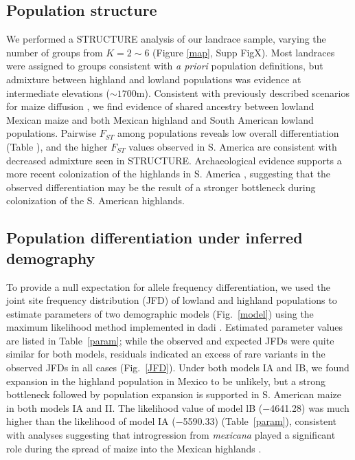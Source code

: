 \subsection*{Population structure}

We performed a {\sf STRUCTURE} analysis \cite[]{Pritchard_2000_10835412,Falush_2003_12930761} of our landrace sample, varying the number of groups from $K=2\sim 6$ (Figure \ref{map}, Supp FigX). 
Most landraces were assigned to groups consistent with \emph{a priori} population definitions, but admixture between highland and lowland populations was evidence at intermediate elevations ($\sim1700$m).  Consistent with previously described scenarios for maize diffusion \cite[]{Piperno_2006_69}, we find evidence of shared ancestry between lowland Mexican maize and both Mexican highland and South American lowland populations.  Pairwise $F_{ST}$ among populations reveals low overall differentiation (Table \label{FstP}), and the higher $F_{ST}$ values observed in S. America are consistent with decreased admixture seen in STRUCTURE.  Archaeological evidence supports a more recent colonization of the highlands in S. America  \cite[]{Piperno_2006_69,Perry_2006_16511492,Grobman_2012_22307642}, suggesting that the observed differentiation may be the result of a stronger  bottleneck during colonization of the S. American highlands. 


\subsection*{Population differentiation under inferred demography}

To provide a null expectation for allele frequency differentiation, we used the joint site frequency distribution (JFD) of lowland and highland populations to estimate parameters of two demographic models (Fig.~\ref{model}) using the maximum likelihood method implemented in {\sf dadi} \cite[]{Gutenkunst_2009_19851460}.  
Estimated parameter values are listed in Table~\ref{param}; while the observed and expected JFDs were quite similar for both models,  residuals indicated an excess of rare variants in the observed JFDs in all cases (Fig.~\ref{JFD}). 
Under both models IA and IB,  we found expansion in the highland population in Mexico to be unlikely, but a strong bottleneck followed by population expansion is supported in S. American maize in both models IA and II.  
The likelihood value of model lB ($-$4641.28) was much higher than the likelihood of model IA ($-$5590.33) (Table~\ref{param}), consistent with analyses suggesting that introgression from \emph{mexicana} played a significant role during the spread of maize into the Mexican highlands \cite{Profford_2013}. 

